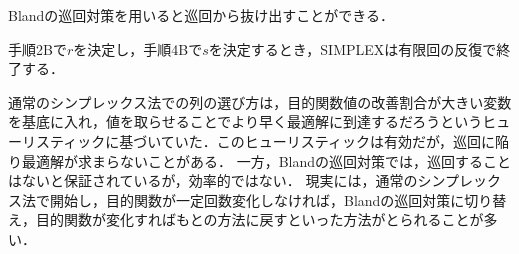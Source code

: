 \documentclass{jsreport}
\begin{document}
Blandの巡回対策を用いると巡回から抜け出すことができる．
\begin{theo}\label{theo:bland}
  手順2Bで$r$を決定し，手順4Bで$s$を決定するとき，SIMPLEXは有限回の反復で終了する．
\end{theo}

通常のシンプレックス法での列の選び方は，目的関数値の改善割合が大きい変数を基底に入れ，値を取らせることでより早く最適解に到達するだろうというヒューリスティックに基づいていた．このヒューリスティックは有効だが，巡回に陥り最適解が求まらないことがある．
一方，Blandの巡回対策では，巡回することはないと保証されているが，効率的ではない．
現実には，通常のシンプレックス法で開始し，目的関数が一定回数変化しなければ，Blandの巡回対策に切り替え，目的関数が変化すればもとの方法に戻すといった方法がとられることが多い．
\end{document}
